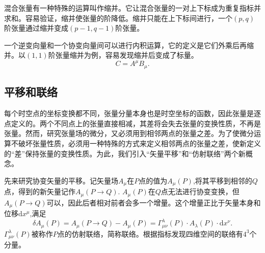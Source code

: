 \documentclass[11pt, a4paper, oneside, onecolumn]{ctexart}
\numberwithin{equation}{subsection}
\begin{document}
混合张量有一种特殊的运算叫作缩并。它让混合张量的⼀对上下标成为重复指标并求和。容易验证，缩并使张量的阶降低。缩并只能在上下标间进行，一个$\left(p,q\right)$阶张量通过缩并变成$\left(p-1,q-1\right)$阶张量。

一个逆变向量和一个协变向量间可以进行内积运算，它的定义是它们外乘后再缩并。以$\left(1,1\right)$阶张量缩并为例，容易发现缩并后变成了标量。
\begin{equation}
C=A^{\mu}B_{\mu}.
\end{equation}

\subsection{平移和联络}
每个时空点的坐标变换都不同，张量分量本身也是时空坐标的函数，因此张量是逐点定义的。两个不同点上的张量直接相减，其差将会失去张量的变换性质，不再是张量。然⽽，研究张量场的微分，又必须⽤到相邻两点的张量之差。为了使微分运算不破坏张量性质，必须⽤⼀种特殊的⽅式来定义相邻两点的张量之差，使新定义的“差”保持张量的变换性质。为此，我们引⼊“⽮量平移”和“仿射联络”两个新概念。

先来研究协变矢量的平移。记矢量场$A_{\mu}$在$P$点的值为$A_{\mu}\left(P\right)$,将其平移到相邻的$Q$点，得到的新矢量记作$A_{\mu}\left(P\to Q\right)$. $A_{\mu}\left(P\right)$在$Q$点无法进行协变变换，但$A_{\mu}\left(P\to Q\right)$可以，因此后者相对前者会多一个增量。这个增量正比于矢量本身和位移$\mathrm{d}x^{\mu}$,满足
\begin{equation}
\delta{}A_{\mu}\left(P\right)=A_{\mu}\left(P\to Q\right)-A_{\mu}\left(P\right)=\Gamma_{\mu\nu}^{\lambda}\left(P\right)\cdot A_{\lambda}\left(P\right)\cdot \mathrm{d}x^{\nu}.\label{1.2.1}
\end{equation}
$\Gamma_{\mu\nu}^{\lambda}\left(P\right)$被称作$P$点的仿射联络，简称联络。根据指标发现四维空间的联络有$4^{3}$个分量。
\end{document}
